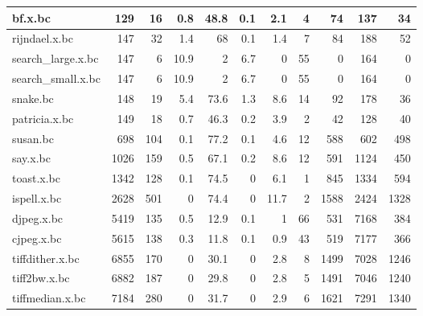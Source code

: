 \begin{tabular}{|l|r|r|r|r|r|r|r|r|r|r|}
\hline
 bf.x.bc              &      129 &   16 &    0.8 &     48.8 &    0.1 &      2.1 &     4 &      74 &        137 &        34 \\
\hline
 rijndael.x.bc        &      147 &   32 &    1.4 &     68   &    0.1 &      1.4 &     7 &      84 &        188 &        52 \\
\hline
 search\_large.x.bc    &      147 &    6 &   10.9 &      2   &    6.7 &      0   &    55 &       0 &        164 &         0 \\
\hline
 search\_small.x.bc    &      147 &    6 &   10.9 &      2   &    6.7 &      0   &    55 &       0 &        164 &         0 \\
\hline
 snake.bc             &      148 &   19 &    5.4 &     73.6 &    1.3 &      8.6 &    14 &      92 &        178 &        36 \\
\hline
 patricia.x.bc        &      149 &   18 &    0.7 &     46.3 &    0.2 &      3.9 &     2 &      42 &        128 &        40 \\
\hline
 susan.bc             &      698 &  104 &    0.1 &     77.2 &    0.1 &      4.6 &    12 &     588 &        602 &       498 \\
\hline
 say.x.bc             &     1026 &  159 &    0.5 &     67.1 &    0.2 &      8.6 &    12 &     591 &       1124 &       450 \\
\hline
 toast.x.bc           &     1342 &  128 &    0.1 &     74.5 &    0   &      6.1 &     1 &     845 &       1334 &       594 \\
\hline
 ispell.x.bc          &     2628 &  501 &    0   &     74.4 &    0   &     11.7 &     2 &    1588 &       2424 &      1328 \\
\hline
 djpeg.x.bc           &     5419 &  135 &    0.5 &     12.9 &    0.1 &      1   &    66 &     531 &       7168 &       384 \\
\hline
 cjpeg.x.bc           &     5615 &  138 &    0.3 &     11.8 &    0.1 &      0.9 &    43 &     519 &       7177 &       366 \\
\hline
 tiffdither.x.bc      &     6855 &  170 &    0   &     30.1 &    0   &      2.8 &     8 &    1499 &       7028 &      1246 \\
\hline
 tiff2bw.x.bc         &     6882 &  187 &    0   &     29.8 &    0   &      2.8 &     5 &    1491 &       7046 &      1240 \\
\hline
 tiffmedian.x.bc      &     7184 &  280 &    0   &     31.7 &    0   &      2.9 &     6 &    1621 &       7291 &      1340 \\
\hline
\end{tabular}
